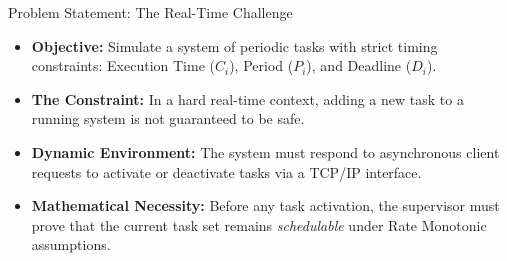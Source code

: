 \begin{frame}{Problem Statement: The Real-Time Challenge}
    \begin{itemize}
        \item \textbf{Objective:} Simulate a system of periodic tasks with strict timing constraints: Execution Time ($C_i$), Period ($P_i$), and Deadline ($D_i$).
        \item \textbf{The Constraint:} In a hard real-time context, adding a new task to a running system is not guaranteed to be safe.
        \item \textbf{Dynamic Environment:} The system must respond to asynchronous client requests to activate or deactivate tasks via a TCP/IP interface.
        \item \textbf{Mathematical Necessity:} Before any task activation, the supervisor must prove that the current task set remains \textit{schedulable} under Rate Monotonic assumptions.
    \end{itemize}
\end{frame}
